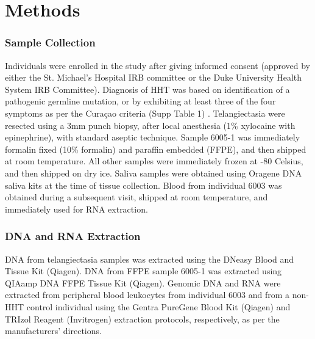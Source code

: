 \section{Methods}
\subsubsection{Sample Collection}
Individuals were enrolled in the study after giving informed consent (approved by either the St. Michael’s Hospital IRB committee or the Duke University Health System IRB Committee).  Diagnosis of HHT was based on identification of a pathogenic germline mutation, or by exhibiting at least three of the four symptoms as per the Cura\c{c}ao criteria (Supp Table 1) \citep{shovlin2000}.
Telangiectasia were resected using a 3mm punch biopsy, after local anesthesia (1\% xylocaine with epinephrine), with standard aseptic technique.  Sample 6005-1 was immediately formalin fixed (10\% formalin) and paraffin embedded (FFPE), and then shipped at room temperature.  All other samples were immediately frozen at -80 Celsius, and then shipped on dry ice.  Saliva samples were obtained using Oragene DNA saliva kits at the time of tissue collection. Blood from individual 6003 was obtained during a subsequent visit, shipped at room temperature, and immediately used for RNA extraction. 

\subsubsection{DNA and RNA Extraction}
DNA from telangiectasia samples was extracted using the DNeasy Blood and Tissue Kit (Qiagen). DNA from FFPE sample 6005-1 was extracted using QIAamp DNA FFPE Tissue Kit (Qiagen). Genomic DNA and RNA were extracted from peripheral blood leukocytes from individual 6003 and from a non-HHT control individual using the Gentra PureGene Blood Kit (Qiagen) and TRIzol Reagent (Invitrogen) extraction protocols, respectively, as per the manufacturers’ directions. 

